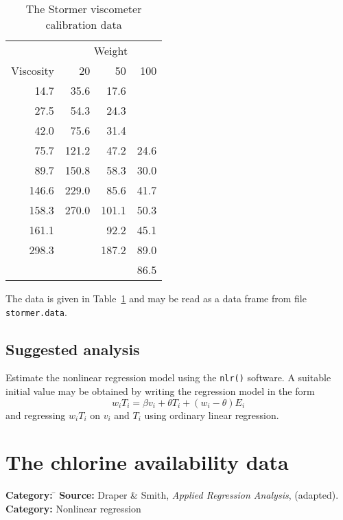 \documentclass{article}
\newcommand{\strutt}{\vrule height 2.5ex depth 0.5ex width 0ex}%
\newcommand{\code}[1]{\texttt{#1}}
\begin{document}
\begin{table}[ht]
\begin{center}
\begin{tabular}{@{\protect\strutt}|r||r|r|r|}
\hline
&\multicolumn{3}{c|}{Weight}\\
Viscosity &   20   &    50   &   100\\
\hline
\hline
   14.7   &  35.6  &   17.6  &      \\
\hline
   27.5   &  54.3  &   24.3  &      \\
\hline
   42.0   &  75.6  &   31.4  &      \\
\hline
   75.7   & 121.2  &   47.2  &  24.6\\
\hline
   89.7   & 150.8  &   58.3  &  30.0\\
\hline
  146.6   & 229.0  &   85.6  &  41.7\\
\hline
  158.3   & 270.0  &  101.1  &  50.3\\
\hline
  161.1   &        &   92.2  &  45.1\\
\hline
  298.3   &        &  187.2  &  89.0\\
          &        &         &  86.5\\
\hline
\end{tabular}
\end{center}

\caption{\label{stormer}The Stormer viscometer calibration data}
\end{table}
The data is given in Table~\ref{stormer} and may be read as a data frame from
file \code{stormer.data}.

\subsection*{Suggested analysis}
Estimate the nonlinear regression model using the \code{nlr()} software.  A
suitable initial value may be obtained by writing the regression model in
the form
\[
w_iT_i = \beta v_i + \theta T_i + (w_i - \theta)E_i
\]
and regressing $w_iT_i$ on $v_i$ and $T_i$ using ordinary linear
regression.

\clearpage\section{The chlorine availability data}
\begin{tabbing}
\textbf{Category:} \= \kill
\textbf{Source:} \> Draper \& Smith, \textit{Applied Regression Analysis}, (adapted).\\
\textbf{Category:} \> Nonlinear regression
\end{tabbing}
\end{document}
